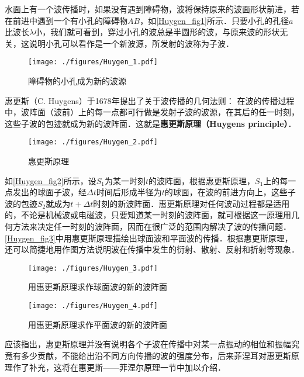 
水面上有一个波传播时，如果没有遇到障碍物，波将保持原来的波面形状前进，若在前进中遇到一个有小孔的障碍物$AB$，如\autoref{Huygen_fig1}所示．只要小孔的孔径$a $比波长$\lambda$小，我们就可看到，穿过小孔的波总是半圆形的波，与原来波的形状无关，这说明小孔可以看作是一个新波源，所发射的波称为子波．

\begin{figure}[ht]
\centering
\texttt{[image: ./figures/Huygen\_1.pdf]}
\caption{障碍物的小孔成为新的波源} \label{Huygen_fig1}
\end{figure}

惠更斯（C. Huygens）于1678年提出了关于波传播的几何法则： 在波的传播过程中，波阵面（波前）上的每一点都可行做是发射子波的波源，在其后的任一时刻，这些子波的包迹就成为新的波阵面．这就是\textbf{惠更斯原理（Huygens principle）}．
\begin{figure}[ht]
\centering
\texttt{[image: ./figures/Huygen\_2.pdf]}
\caption{惠更斯原理} \label{Huygen_fig2}
\end{figure}

如\autoref{Huygen_fig2}所示，设$S_1$为某一时刻$t $的波阵面，根据惠更斯原理，$S_1$上的每一点发出的球面子波，经$\Delta t$时间后形成半径为$t$的球面，在波的前进方向上，这些子波的包迹$S_2$就成为$t+\Delta t$时刻的新波阵面．惠更斯原理对任何波动过程都是适用的，不论是机械波或电磁波，只要知道某一时刻的波阵面，就可根据这一原理用几何方法来决定任一时刻的波阵面，因而在很广泛的范围内解决了波的传播问题．\autoref{Huygen_fig3}中用惠更斯原理描绘出球面波和平面波的传播．根据惠更斯原理，还可以简捷地用作图方法说明波在传播中发生的衍射、散射、反射和折射等现象．
\begin{figure}[ht]
\centering
\texttt{[image: ./figures/Huygen\_3.pdf]}
\caption{用惠更斯原理求作球面波的新的波阵面} \label{Huygen_fig3}
\end{figure}
\begin{figure}[ht]
\centering
\texttt{[image: ./figures/Huygen\_4.pdf]}
\caption{用惠更斯原理求作平面波的新的波阵面} \label{Huygen_fig4}
\end{figure}
应该指出，惠更斯原理并没有说明各个子波在传播中对某一点振动的相位和振幅究竟有多少贡献，不能给出沿不同方向传播的波的强度分布，后来菲涅耳对惠更斯原理作了补充，这将在惠更斯——菲涅尔原理一节中加以介绍．